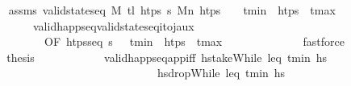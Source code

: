 \begin{isabellebody}
\ \ \ \ \ \ \ \ \ \ \isamarkupfalse%
\ assms\ {\isacartoucheopen}valid{\isacharunderscore}{\kern0pt}state{\isacharunderscore}{\kern0pt}seq\ M\ {\isacharparenleft}{\kern0pt}tl\ htps{\isacharparenright}{\kern0pt}\ {\isasympi}s\ M\isactrlsub n{\isacartoucheclose}\ {\isacartoucheopen}htps\ {\isacharequal}{\kern0pt}\ {\isacharbrackleft}{\kern0pt}{\isacharbrackright}{\kern0pt}\ {\isacharat}{\kern0pt}\ t\isactrlsub m\isactrlsub i\isactrlsub n\ {\isacharhash}{\kern0pt}\ htps{\isacharprime}{\kern0pt}\ {\isacharat}{\kern0pt}\ {\isacharbrackleft}{\kern0pt}t\isactrlsub m\isactrlsub a\isactrlsub x{\isacharbrackright}{\kern0pt}{\isacartoucheclose}\isanewline
\ \ \ \ \ \ \ \ \ \ \ \ \ \ \ \ valid{\isacharunderscore}{\kern0pt}happ{\isacharunderscore}{\kern0pt}seq{\isacharunderscore}{\kern0pt}valid{\isacharunderscore}{\kern0pt}state{\isacharunderscore}{\kern0pt}seq{\isacharunderscore}{\kern0pt}i{\isacharunderscore}{\kern0pt}to{\isacharunderscore}{\kern0pt}j{\isacharunderscore}{\kern0pt}aux\isanewline
\ \ \ \ \ \ \ \ \ \ \ \ \ \ \ \ \ \ {\isacharbrackleft}{\kern0pt}OF\ {\isacartoucheopen}htps{\isacharunderscore}{\kern0pt}seq\ {\isasympi}s\ {\isacharparenleft}{\kern0pt}{\isacharbrackleft}{\kern0pt}{\isacharbrackright}{\kern0pt}\ {\isacharat}{\kern0pt}\ t\isactrlsub m\isactrlsub i\isactrlsub n\ {\isacharhash}{\kern0pt}\ htps{\isacharprime}{\kern0pt}\ {\isacharat}{\kern0pt}\ t\isactrlsub m\isactrlsub a\isactrlsub x\ {\isacharhash}{\kern0pt}\ {\isacharbrackleft}{\kern0pt}{\isacharbrackright}{\kern0pt}{\isacharparenright}{\kern0pt}{\isacartoucheclose}{\isacharbrackright}{\kern0pt}\isanewline
\ \ \ \ \ \ \ \ \ \ \isamarkupfalse%
\ fastforce\isanewline
\ \ \ \ \ \ \ \ \isamarkupfalse%
\ \isamarkupfalse%
\ {\isacharquery}{\kern0pt}thesis\isanewline
\ \ \ \ \ \ \ \ \ \ \isamarkupfalse%
\ valid{\isacharunderscore}{\kern0pt}happ{\isacharunderscore}{\kern0pt}seq{\isacharunderscore}{\kern0pt}app{\isacharunderscore}{\kern0pt}iff{\isacharbrackleft}{\kern0pt}\ hstakeWhile\ {\isacharparenleft}{\kern0pt}leq\ t\isactrlsub m\isactrlsub i\isactrlsub n{\isacharparenright}{\kern0pt}\ hs{\isachardoublequoteclose}\ \isanewline
\ \ \ \ \ \ \ \ \ \ \ \ \ \ \ \ \ \ \ \ \ \ \ \ \ \ \ \ \ \ \ \ \ \ \ \ \ \ hsdropWhile\ {\isacharparenleft}{\kern0pt}leq\ t\isactrlsub m\isactrlsub i\isactrlsub n{\isacharparenright}{\kern0pt}\ hs{\isachardoublequoteclose}{\isacharbrackright}{\kern0pt}\isanewline

\end{isabellebody}
